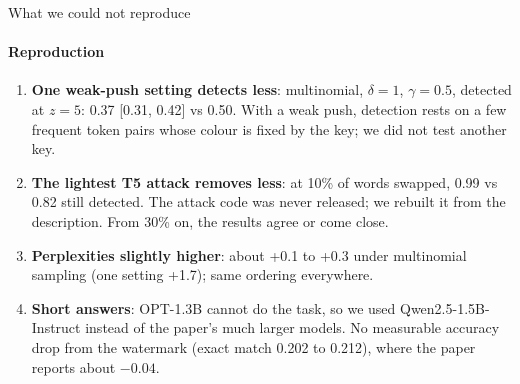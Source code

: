 \documentclass[aspectratio=169,10pt,t]{beamer}
\newcommand{\key}[1]{\textcolor{calblue}{\textbf{#1}}}
\begin{document}
\begin{frame}{What we could not reproduce}
  \framesubtitle{Reproduction}
  \begin{signalbox}
    \begin{enumerate}
      \item \key{One weak-push setting detects less}: multinomial, $\delta = 1$, $\gamma = 0.5$, detected at $z = 5$: 0.37 [0.31, 0.42] vs 0.50. With a weak push, detection rests on a few frequent token pairs whose colour is fixed by the key; we did not test another key.
      \item \key{The lightest T5 attack removes less}: at 10\% of words swapped, 0.99 vs 0.82 still detected. The attack code was never released; we rebuilt it from the description. From 30\% on, the results agree or come close.
      \item \key{Perplexities slightly higher}: about +0.1 to +0.3 under multinomial sampling (one setting +1.7); same ordering everywhere.
      \item \key{Short answers}: OPT-1.3B cannot do the task, so we used Qwen2.5-1.5B-Instruct instead of the paper's much larger models. No measurable accuracy drop from the watermark (exact match 0.202 to 0.212), where the paper reports about $-0.04$.
    \end{enumerate}
  \end{signalbox}
\end{frame}

\end{document}
